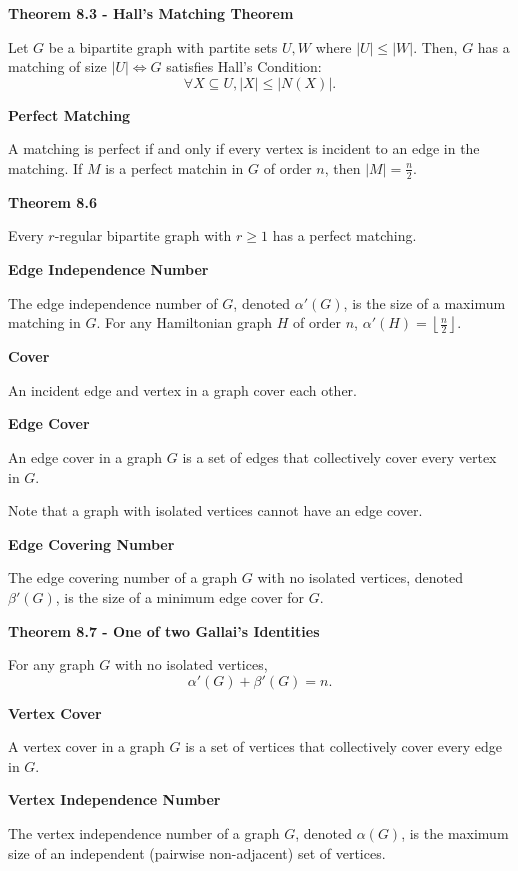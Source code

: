 \documentclass{article}
\begin{document}
\medskip\noindent\textbf{Theorem 8.3 - Hall's Matching Theorem}

	Let $G$ be a bipartite graph with partite sets $U,W$ where $|U| \leq |W|$.
	Then, $G$ has a matching of size $|U| \iff G$ satisfies Hall's Condition: $$\forall X \subseteq U, |X| \leq |N(X)|.$$

\medskip\noindent\textbf{Perfect Matching}

	A matching is perfect if and only if every vertex is incident to an edge in the matching. If $M$ is a perfect matchin in $G$ of order $n$, then $|M| = \frac n2$.

\medskip\noindent\textbf{Theorem 8.6}

	Every $r$-regular bipartite graph with $r \geq 1$ has a perfect matching.

\medskip\noindent\textbf{Edge Independence Number}

	The edge independence number of $G$, denoted $\alpha'(G)$, is the size of a maximum matching in $G$.
	For any Hamiltonian graph $H$ of order $n$, $\alpha'(H) = \left\lfloor \frac n2 \right\rfloor$.

\medskip\noindent\textbf{Cover}

	An incident edge and vertex in a graph cover each other.

\medskip\noindent\textbf{Edge Cover}

	An edge cover in a graph $G$ is a set of edges that collectively cover every vertex in $G$.

	Note that a graph with isolated vertices cannot have an edge cover.

\medskip\noindent\textbf{Edge Covering Number}

	The edge covering number of a graph $G$ with no isolated vertices, denoted $\beta'(G)$, is the size of a minimum edge cover for $G$.

\medskip\noindent\textbf{Theorem 8.7 - One of two Gallai's Identities}

	For any graph $G$ with no isolated vertices, $$\alpha'(G) + \beta'(G) = n.$$

\medskip\noindent\textbf{Vertex Cover}

	A vertex cover in a graph $G$ is a set of vertices that collectively cover every edge in $G$.

\medskip\noindent\textbf{Vertex Independence Number}

	The vertex independence number of a graph $G$, denoted $\alpha(G)$, is the maximum size of an independent (pairwise non-adjacent) set of vertices.
\end{document}
